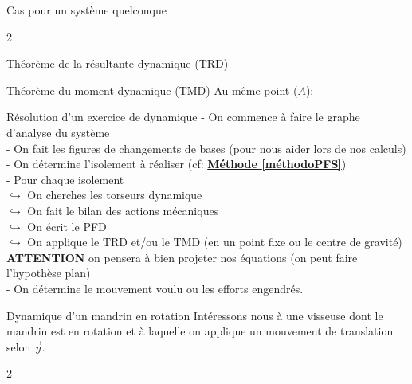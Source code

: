 \documentclass{article} %
\begin{document}
{\begin{exemple}{Cas pour un système quelconque}
\end{exemple}
\begin{multicols}{2}
\begin{propriété}{Théorème de la résultante dynamique (TRD)}
\end{propriété}
\begin{propriété}{Théorème du moment dynamique (TMD)}
Au même point ($A$):
\end{propriété}
\end{multicols}
\begin{méthode}{Résolution d'un exercice de dynamique}
- On commence à faire le graphe d'analyse du système\\
- On fait les figures de changements de bases (pour nous aider lors de nos calculs)\\
- On détermine l'isolement à réaliser (cf: \hyperref[méthodoPFS]{\textcolor{myorange}{\textbf{Méthode \ref*{méthodoPFS}}}})\\
- Pour chaque isolement\\
\hspace*{10pt}$\hookrightarrow$ On cherches les torseurs dynamique\\
\hspace*{10pt}$\hookrightarrow$ On fait le bilan des actions mécaniques\\
\hspace*{10pt}$\hookrightarrow$ On écrit le PFD\\
\hspace*{10pt}$\hookrightarrow$ On applique le TRD et/ou le TMD (en un point fixe ou le centre de gravité)\\
\hspace*{18pt} {\small \textbf{ATTENTION} on pensera à bien projeter nos équations (on peut faire l'hypothèse plan)}\\
- On détermine le mouvement voulu ou les efforts engendrés.
\end{méthode}
\begin{exemple}{Dynamique d'un mandrin en rotation}
Intéressons nous à une visseuse dont le mandrin est en rotation et à laquelle on applique un mouvement de translation selon $\overrightarrow{y}$.
\begin{multicols}{2}\vspace*{-30pt}
\noindent\begin{center}

\end{center}
\end{multicols}
\end{exemple}}
\end{document}
